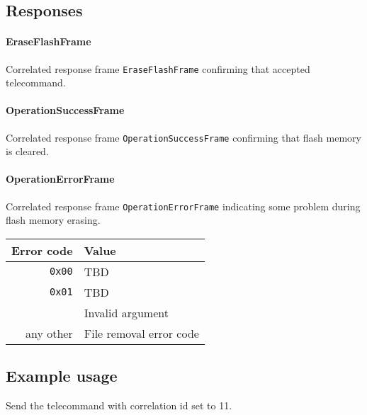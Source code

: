 \subsection{Responses}
\paragraph{EraseFlashFrame}
Correlated response frame \texttt{EraseFlashFrame} confirming that \obc accepted telecommand.

\paragraph{OperationSuccessFrame}
Correlated response frame \texttt{OperationSuccessFrame} confirming that flash memory is cleared.

\paragraph{OperationErrorFrame}
Correlated response frame \texttt{OperationErrorFrame} indicating some problem during flash memory erasing.


\begin{tabular}{r | l}
    Error code & Value \\
    \hline
    \texttt{0x00}   & TBD \\
    \texttt{0x01}   & TBD \\
                    & Invalid argument \\
    any other & File removal error code \\
\end{tabular}


\subsection{Example usage}
Send the telecommand with correlation id set to 11.

